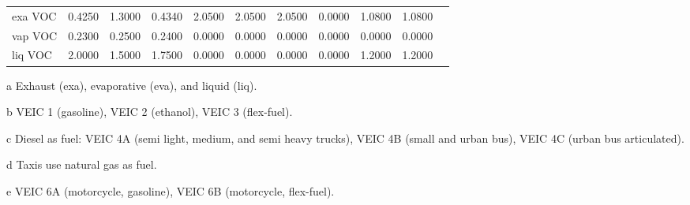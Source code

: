 \begin{table}
\begin{threeparttable}[b]
\begin{tabular}{@{} lrrrrrrrrrr @{} }
exa VOC    & 0.4250 & 1.3000 & 0.4340                  & 2.0500  & 2.0500  & 2.0500                & 0.0000                                   & 1.0800  & 1.0800                  \\
vap VOC    & 0.2300 & 0.2500 & 0.2400                  & 0.0000  & 0.0000  & 0.0000                & 0.0000                                   & 0.0000  & 0.0000                  \\
liq VOC    & 2.0000 & 1.5000 & 1.7500                  & 0.0000  & 0.0000  & 0.0000                & 0.0000                                   & 1.2000  & 1.2000                  \\
\bottomrule
\end{tabular}
\begin{tablenotes}
{\scriptsize
	\item[a] Exhaust (exa), evaporative (eva), and liquid (liq).
	\item[b] VEIC 1 (gasoline), VEIC 2 (ethanol), VEIC 3 (flex-fuel).
	\item[c] Diesel as fuel: VEIC 4A (semi light, medium, and semi heavy trucks), VEIC 4B (small and urban bus), VEIC 4C (urban bus articulated).
	\item[d] Taxis use natural gas as fuel.
	\item[e] VEIC 6A (motorcycle, gasoline), VEIC 6B (motorcycle, flex-fuel).}
\end{tablenotes}
\end{threeparttable}
\end{table}

